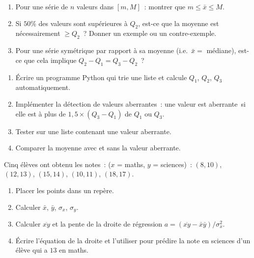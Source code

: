 \begin{challenge}
\begin{enumerate}
  \item Pour une s\'erie de $n$ valeurs dans $[m,M]$~: montrer que
        $m \leq \bar{x} \leq M$.
  \item Si $50\%$ des valeurs sont sup\'erieures \`a $Q_2$, est-ce que
        la moyenne est n\'ecessairement $\geq Q_2$~?
        Donner un exemple ou un contre-exemple.
  \item Pour une s\'erie sym\'etrique par rapport \`a sa moyenne
        (i.e.\ $\bar{x}=$ m\'ediane), est-ce que cela implique
        $Q_2-Q_1 = Q_3-Q_2$~?
\end{enumerate}
\end{challenge}

\begin{challenge}
\begin{enumerate}
  \item \'Ecrire un programme Python qui trie une liste et calcule
        $Q_1$, $Q_2$, $Q_3$ automatiquement.
  \item Impl\'ementer la d\'etection de valeurs aberrantes~:
        une valeur est \og aberrante\fg\ si elle est \`a plus de $1{,}5\times(Q_3-Q_1)$
        de $Q_1$ ou $Q_3$.
  \item Tester sur une liste contenant une valeur aberrante.
  \item Comparer la moyenne avec et sans la valeur aberrante.
\end{enumerate}
\end{challenge}

\begin{challenge}
Cinq \'el\`eves ont obtenu les notes~: ($x$ = maths, $y$ = sciences)~:
$(8,10)$, $(12,13)$, $(15,14)$, $(10,11)$, $(18,17)$.
\begin{enumerate}
  \item Placer les points dans un rep\`ere.
  \item Calculer $\bar{x}$, $\bar{y}$, $\sigma_x$, $\sigma_y$.
  \item Calculer $\overline{xy}$ et la pente de la droite de r\'egression
        $a = (\overline{xy}-\bar{x}\bar{y})/\sigma_x^2$.
  \item \'Ecrire l'\'equation de la droite et l'utiliser pour pr\'edire
        la note en sciences d'un \'el\`eve qui a $13$ en maths.
\end{enumerate}
\end{challenge}

